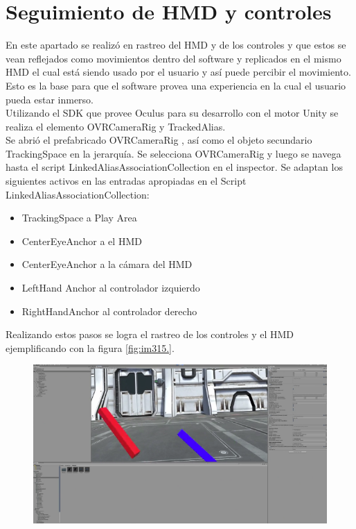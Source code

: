 \section{Seguimiento de HMD y controles}
En este apartado se realizó en rastreo del HMD y de los controles y que estos se vean reflejados como movimientos dentro del software y replicados en el mismo HMD el cual está 
siendo usado por el usuario y así puede percibir el movimiento. Esto es la base para que el software provea una experiencia en la cual el usuario pueda estar inmerso.\\
Utilizando el SDK que provee Oculus para su desarrollo con el motor Unity se realiza el elemento OVRCameraRig y TrackedAlias.\\
Se abrió el prefabricado OVRCameraRig , así como el objeto secundario TrackingSpace en la jerarquía. Se selecciona OVRCameraRig y luego se navega hasta el script 
LinkedAliasAssociationCollection en el inspector. Se adaptan los siguientes activos en las entradas apropiadas en el Script LinkedAliasAssociationCollection:\\
\begin{itemize}
    \item TrackingSpace a Play Area
    \item CenterEyeAnchor a el HMD
    \item CenterEyeAnchor a la cámara del HMD
    \item LeftHand Anchor al controlador izquierdo
    \item RightHandAnchor al controlador derecho
\end{itemize}
Realizando estos pasos se logra el rastreo de los controles y el HMD ejemplificando con la figura \ref{fig:im315.}.
\begin{figure}[H]
	\begin{center}
 		\includegraphics[width = .7\textwidth]{source/images/image44.png}
	\end{center} 
\end{figure}

